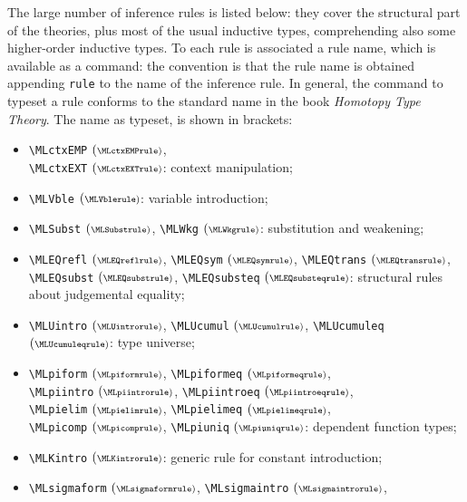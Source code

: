 \documentclass{amsart}
\begin{document}
The large number of inference rules is listed below: they cover the
structural part of the theories, plus most of the usual inductive
types, comprehending also some higher-order inductive types. To each
rule is associated a rule name, which is available as a command: the
convention is that the rule name is obtained appending \verb|rule| to
the name of the inference rule. In general, the command to typeset a
rule conforms to the standard name in the book \emph{Homotopy Type
  Theory}. The name as typeset, is shown in brackets:
\begin{itemize}
\item \verb|\MLctxEMP| $(\scriptstyle\MLctxEMPrule)$,\\ \verb|\MLctxEXT|
  $(\scriptstyle\MLctxEXTrule)$: context manipulation;
\item \verb|\MLVble| $(\scriptstyle\MLVblerule)$: variable
  introduction;
\item \verb|\MLSubst| $(\scriptstyle\MLSubstrule)$, 
  \verb|\MLWkg|
  $(\scriptstyle\MLWkgrule)$: substitution and weakening;
\item \verb|\MLEQrefl| $(\scriptstyle\MLEQreflrule)$,
  \verb|\MLEQsym| $(\scriptstyle\MLEQsymrule)$, 
  \verb|\MLEQtrans| $(\scriptstyle\MLEQtransrule)$, \\
  \verb|\MLEQsubst| $(\scriptstyle\MLEQsubstrule)$, 
  \verb|\MLEQsubsteq| $(\scriptstyle\MLEQsubsteqrule)$: structural
  rules about judgemental equality;
\item \verb|\MLUintro| $(\scriptstyle\MLUintrorule)$, 
  \verb|\MLUcumul| $(\scriptstyle\MLUcumulrule)$, 
  \verb|\MLUcumuleq| $(\scriptstyle\MLUcumuleqrule)$: type universe;
\item \verb|\MLpiform| $(\scriptstyle\MLpiformrule)$, 
  \verb|\MLpiformeq| $(\scriptstyle\MLpiformeqrule)$, \\
  \verb|\MLpiintro| $(\scriptstyle\MLpiintrorule)$, 
  \verb|\MLpiintroeq| $(\scriptstyle\MLpiintroeqrule)$, \\
  \verb|\MLpielim| $(\scriptstyle\MLpielimrule)$, 
  \verb|\MLpielimeq| $(\scriptstyle\MLpielimeqrule)$, \\
  \verb|\MLpicomp| $(\scriptstyle\MLpicomprule)$, 
  \verb|\MLpiuniq| $(\scriptstyle\MLpiuniqrule)$: dependent function
  types;
\item \verb|\MLKintro| $(\scriptstyle\MLKintrorule)$: generic rule for
  constant introduction;
\item \verb|\MLsigmaform| $(\scriptstyle\MLsigmaformrule)$, 
  \verb|\MLsigmaintro| $(\scriptstyle\MLsigmaintrorule)$, 

\end{itemize}
\end{document}
